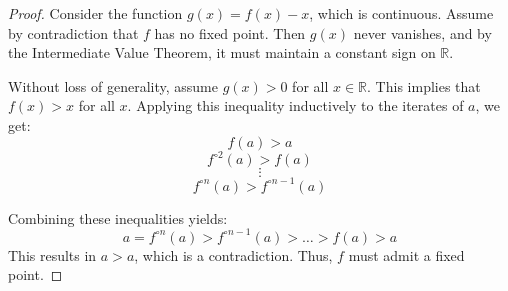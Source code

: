 \begin{solution}
    \begin{proof}
        Consider the function \( g\left(x\right) = f\left(x\right) - x \), which is continuous. Assume by contradiction that \( f \) has no fixed point. Then \( g\left(x\right) \) never vanishes, and by the Intermediate Value Theorem, it must maintain a constant sign on \( \mathbb{R} \).

        Without loss of generality, assume \( g\left(x\right) > 0 \) for all \( x \in \mathbb{R} \). This implies that \( f\left(x\right) > x \) for all \( x \). Applying this inequality inductively to the iterates of \( a \), we get:
        \[
            f\left(a\right) > a
        \]
        \[
            f^{\circ 2}\left(a\right) > f\left(a\right)
        \]
        \[
            \vdots
        \]
        \[
            f^{\circ n}\left(a\right) > f^{\circ n-1}\left(a\right)
        \]

        Combining these inequalities yields:
        \[
            a = f^{\circ n}\left(a\right) > f^{\circ n-1}\left(a\right) > \dots > f\left(a\right) > a
        \]
        This results in \( a > a \), which is a contradiction. Thus, \( f \) must admit a fixed point.
    \end{proof}
\end{solution}
